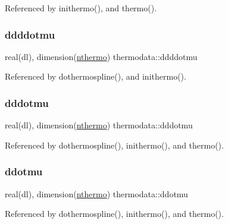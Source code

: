 Referenced by inithermo(), and thermo().

\mbox{\label{namespacethermodata_a679a88090aed732261c9ca690eddfe2b}} 
\subsubsection{\texorpdfstring{ddddotmu}{ddddotmu}}
{\footnotesize\ttfamily real(dl), dimension(\mbox{\hyperlink{namespacethermodata_ab5a6325bede2b0cce4e867e9e1e18215}{nthermo}}) thermodata\+::ddddotmu\hspace{0.3cm}{\ttfamily [private]}}



Referenced by dothermospline(), and inithermo().

\mbox{\label{namespacethermodata_ad781349a01ad4eff9227f42ed5c67362}} 
\subsubsection{\texorpdfstring{dddotmu}{dddotmu}}
{\footnotesize\ttfamily real(dl), dimension(\mbox{\hyperlink{namespacethermodata_ab5a6325bede2b0cce4e867e9e1e18215}{nthermo}}) thermodata\+::dddotmu\hspace{0.3cm}{\ttfamily [private]}}



Referenced by dothermospline(), inithermo(), and thermo().

\mbox{\label{namespacethermodata_a64db577ccef33cb28a8ef97b9c49df58}} 
\subsubsection{\texorpdfstring{ddotmu}{ddotmu}}
{\footnotesize\ttfamily real(dl), dimension(\mbox{\hyperlink{namespacethermodata_ab5a6325bede2b0cce4e867e9e1e18215}{nthermo}}) thermodata\+::ddotmu\hspace{0.3cm}{\ttfamily [private]}}



Referenced by dothermospline(), inithermo(), and thermo().

